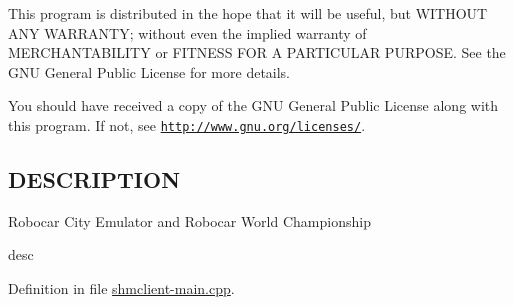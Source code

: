 This program is distributed in the hope that it will be useful, but W\-I\-T\-H\-O\-U\-T A\-N\-Y W\-A\-R\-R\-A\-N\-T\-Y; without even the implied warranty of M\-E\-R\-C\-H\-A\-N\-T\-A\-B\-I\-L\-I\-T\-Y or F\-I\-T\-N\-E\-S\-S F\-O\-R A P\-A\-R\-T\-I\-C\-U\-L\-A\-R P\-U\-R\-P\-O\-S\-E. See the G\-N\-U General Public License for more details.

You should have received a copy of the G\-N\-U General Public License along with this program. If not, see \href{http://www.gnu.org/licenses/}{\tt http\-://www.\-gnu.\-org/licenses/}.\hypertarget{traffic_8cpp_DESCRIPTION}{}\subsection{D\-E\-S\-C\-R\-I\-P\-T\-I\-O\-N}\label{traffic_8cpp_DESCRIPTION}
Robocar City Emulator and Robocar World Championship

desc 

Definition in file \hyperlink{shmclient-main_8cpp_source}{shmclient-\/main.\-cpp}.

